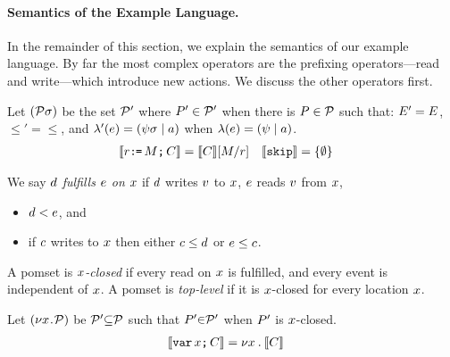 \paragraph{Semantics of the Example Language.}
In the remainder of this section, we explain the semantics of our example
language.  By far the most complex operators are the prefixing
operators---read and write---which introduce new actions.  We discuss
the other operators first.


\begin{definition}
Let $(\mathcal{P}\sigma)$ be the set $\mathcal{P}'$ where $P'\in\mathcal{P}'$ when
there is $P\in\mathcal{P}$ such that:
$E' = E$,
${\le'} = {\le}$, 
and
$\lambda'(e) = (\psi\sigma \mid a)$ when $\lambda(e) = (\psi \mid a)$.
\begin{align*}
  \llbracket r\texttt{:}\mkern-1mu\texttt{=}\,M\texttt{;}\,\allowbreak C\rrbracket & =
  \llbracket C\rrbracket[M/r] 
  &  
  \llbracket\texttt{skip}\rrbracket & =
  \{ \emptyset \}
\end{align*}
\end{definition}


\begin{definition}
  \label{def:rf}
  We say $d$ \emph{fulfills $e$ on $x$} if $d$ \externally writes
  $v$ to $x$, $e$ \externally reads $v$ from $x$,
  \begin{itemize}
  \item
    $d < e$, and
  \item
    if $c$ \externally writes to $x$ then either $c \leq d$ or $e \leq c$.
  \end{itemize}

  A pomset is \emph{$x$-closed} if every \external read on $x$ is fulfilled,
  and every event is independent of $x$.
  A pomset is \emph{top-level} if it is $x$-closed for every location
  $x$.
  
  Let $(\nu x\!\mathbin.\!\mathcal{P})$ be  $\mathcal{P}'{\subseteq}\mathcal{P}$ such that $P'{\in}\mathcal{P}'$
  when $P'$ is $x$-closed.
\begin{align*}
  \llbracket\texttt{var}\,x\texttt{;}\,\allowbreak C\rrbracket & =
  \nu x \mathbin. \llbracket C\rrbracket  
\end{align*}
\end{definition}

